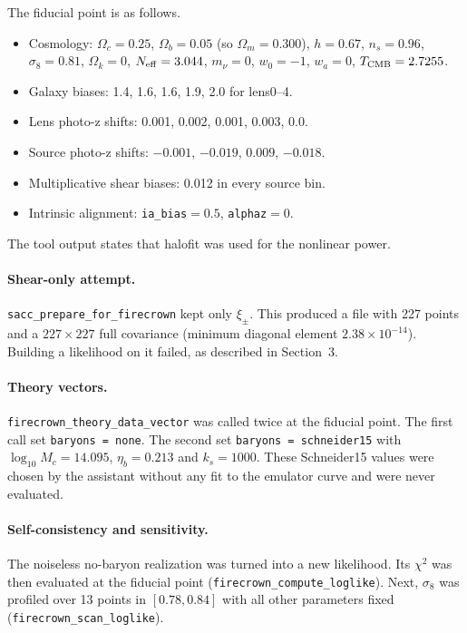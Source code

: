 \documentclass[11pt,a4paper]{article}
\begin{document}
The fiducial point is as follows.
\begin{itemize}
\item Cosmology: $\Omega_c=0.25$, $\Omega_b=0.05$ (so $\Omega_m=0.300$), $h=0.67$, $n_s=0.96$, $\sigma_8=0.81$, $\Omega_k=0$, $N_{\rm eff}=3.044$, $m_\nu=0$, $w_0=-1$, $w_a=0$, $T_{\rm CMB}=2.7255$.
\item Galaxy biases: 1.4, 1.6, 1.6, 1.9, 2.0 for lens0--4.
\item Lens photo-z shifts: 0.001, 0.002, 0.001, 0.003, 0.0.
\item Source photo-z shifts: $-0.001$, $-0.019$, $0.009$, $-0.018$.
\item Multiplicative shear biases: 0.012 in every source bin.
\item Intrinsic alignment: \texttt{ia\_bias}$=0.5$, \texttt{alphaz}$=0$.
\end{itemize}
The tool output states that halofit was used for the nonlinear power.

\paragraph{Shear-only attempt.} \texttt{sacc\_prepare\_for\_firecrown} kept only $\xi_\pm$. This produced a file with 227 points and a $227\times227$ full covariance (minimum diagonal element $2.38\times10^{-14}$). Building a likelihood on it failed, as described in Section~3.

\paragraph{Theory vectors.} \texttt{firecrown\_theory\_data\_vector} was called twice at the fiducial point. The first call set \texttt{baryons = none}. The second set \texttt{baryons = schneider15} with $\log_{10}M_c=14.095$, $\eta_b=0.213$ and $k_s=1000$. These Schneider15 values were chosen by the assistant without any fit to the emulator curve and were never evaluated.

\paragraph{Self-consistency and sensitivity.} The noiseless no-baryon realization was turned into a new likelihood. Its $\chi^2$ was then evaluated at the fiducial point (\texttt{firecrown\_compute\_loglike}). Next, $\sigma_8$ was profiled over 13 points in $[0.78,0.84]$ with all other parameters fixed (\texttt{firecrown\_scan\_loglike}).
\end{document}
